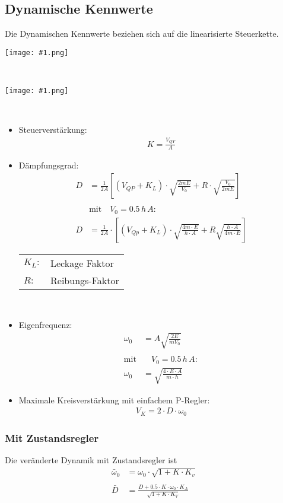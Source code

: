 \documentclass[landscape,a4paper,10pt]{article}
\newcommand{\graphiccol}[1]{
\noindent
\begin{minipage}{\columnwidth}
\centering
\texttt{[image: \#1.png]}
\end{minipage}
\medskip \\
}
\begin{document}
\begin{multicols*}{3}
\subsection{Dynamische Kennwerte}
Die Dynamischen Kennwerte beziehen sich auf die linearisierte Steuerkette.

\graphiccol{differentialgleichungssystem}

\graphiccol{steuerkette}
\begin{itemize}
\item Steuerverstärkung:
\begin{align*}
K = \frac{V_{QY}}{A}
\end{align*}
\item Dämpfungsgrad:
\begin{align*}
D &= \frac{1}{2 A} \left[ (V_{QP} + K_L ) \cdot \sqrt{\frac{2 m E}{V_0}} + R \cdot \sqrt{\frac{V_0}{2 m E}} \right] \\
\\
&\text{mit}\quad V_0 = 0.5 \,  h \, A: \\
D &= \frac{1}{2 A} \cdot \left[ (V_{Qp} + K_L) \cdot \sqrt{\frac{4  m \cdot E}{h \cdot A}} + R \sqrt{ \frac{h \cdot A}{4  m \cdot E}} \right]
\end{align*}
\begin{tabular}{ll}
$K_L:$ & Leckage Faktor \\
$R:$ & Reibungs-Faktor
\end{tabular} \\

\item Eigenfrequenz:
\begin{align*}
\omega_0 &= A \sqrt{\frac{2 E}{m V_0}} \\
\\
\text{mit} & \quad V_0 = 0.5 \, h \, A: \\
\omega_0 &= \sqrt{ \frac{4 \cdot E \cdot A}{m \cdot h} } 
\end{align*}
\item Maximale Kreisverstärkung mit einfachem P-Regler:
\begin{align*}
V_K = 2 \cdot D \cdot \omega_0 
\end{align*}
\end{itemize}


\subsubsection{Mit Zustandsregler}
Die veränderte Dynamik mit Zustandsregler ist
\begin{align*}
\bar{\omega}_0 &= \omega_0 \cdot \sqrt{1 + K \cdot K_v} \\
\\
\bar{D} &= \frac{D + 0.5\cdot K \cdot \omega_0 \cdot K_A}{\sqrt{1+K\cdot K_V}}
\end{align*}


\end{multicols*}
\end{document}
